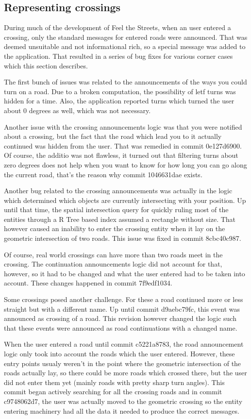 \documentclass[nolof,digital]{fithesis3}
\begin{document}
\subsection{Representing crossings}
During much of the development of Feel the Streets, when an user entered a crossing, only the standard messages for entered roads were announced. That was deemed unsuitable and not informational rich, so a special message was added to the application. That resulted in a series of bug fixes for various corner cases which this section describes.

The first bunch of issues was related to the announcements of the ways you could turn on a road. Due to a broken computation, the possibility of letf turns was hidden for a time. Also, the application reported turns which turned the user about 0 degrees as well, which was not necessary.

Another issue with the crossing announcements logic was that you were notified about a crossing, but the fact that the road which lead you to it actually continued was hidden from the user. That was remedied in commit 0e127d6900. Of course, the additio was not flawless, it turned out that filtering turns about zero degrees does not help when you want to know for how long you can go along the current road, that's the reason why commit 1046631dae exists.

Another bug related to the crossing announcements was actually in the logic which determined which objects are currently intersecting with your position. Up until that time, the spatial intersection query for quickly ruling most of the entities through a R Tree based index assumed a rectangle without size. That however caused an inability to enter the crossing entity when it lay on the geometric intersection of two roads. This issue was fixed in commit 8cbc40c987.

Of course, real world crossings can have more than two roads meet in the crossing. The continuation announcements logic did not account for that, however, so it had to be changed and what the user entered had to be taken into account. These changes happened in commit 7f9edf1034.

Some crossings posed another challenge. For these a road continued more or less straight but with a different name. Up until commit d9aebc79fc, this event was announced as crossing of a road. This revision however changed the logic such that these events were announced as road continuations with a changed name.

When the user entered a road until commit c5221a8783, the road announcement logic only took into account the roads which the user entered. However, these entry points usualy weren't in the point where the geometric intersection of the roads actually lay, so there could be more roads which crossed there, but the user did not enter them yet (mainly roads with pretty sharp turn angles). This commit began actively searching for all the crossing roads and in commit c9748062d7, the user was actually moved to the geometric crossing so the entity entering machinery had all the data it needed to produce the correct messages.
\end{document}
